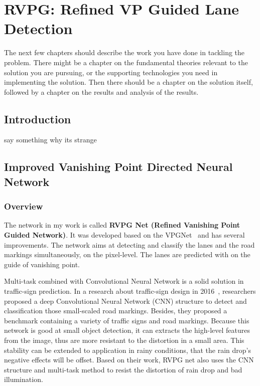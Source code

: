 
\chapter{RVPG: Refined VP Guided Lane Detection}
\label{cha:model}
\begin{spacing}{1.5}
\setlength{\parskip}{0.3in}

The next few chapters should describe the work you have done in tackling the problem. There might be a chapter on the fundamental theories relevant to the solution you are pursuing, or the supporting technologies you need in implementing the solution. Then there should be a chapter on the solution itself, followed by a chapter on the results and analysis of the results.

\section{Introduction}

say something why its strange

\section{Improved Vanishing Point Directed Neural Network}
\label{sec:MD_model}

\subsection{Overview}
The network in my work is called \textbf{RVPG Net (Refined Vanishing Point Guided Network)}. It was developed based on the VPGNet~\cite{lee2017vpgnet} and has several improvements. The network aims at detecting and classify the lanes and the road markings simultaneously, on the pixel-level. The lanes are predicted with on the guide of vanishing point. 

Multi-task combined with Convolutional Neural Network is a solid solution in traffic-sign prediction. In a research about traffic-sign design in 2016~\cite{zhu2016traffic, huval2015empirical}, researchers proposed a deep Convolutional Neural Network (CNN) structure to detect and classification those small-scaled road markings. Besides, they proposed a benchmark containing a variety of traffic signs and road markings. Because this network is good at small object detection, it can extracts the high-level features from the image, thus are more resistant to the distortion in a small area. This stability can be extended to application in rainy conditions, that the rain drop's negative effects will be offset. Based on their work, RVPG net also uses the CNN structure and multi-task method to resist the distortion of rain drop and bad illumination.


\end{spacing}
